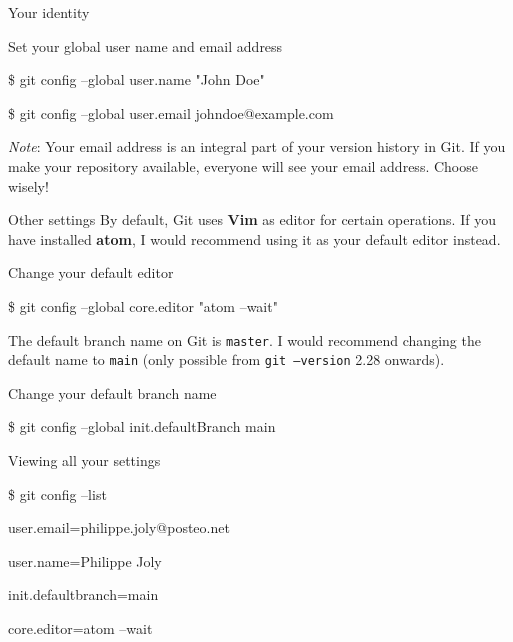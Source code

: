 \documentclass[handout]{beamer}
\begin{document}
\begin{frame}{Your identity}
  \begin{exampleblock}{Set your global user name and email address}
    \begin{semiverbatim}
      \item \$ git config --global user.name "John Doe"
      \item \$ git config --global user.email johndoe@example.com
    \end{semiverbatim}
  \end{exampleblock}
  \textit{Note}: Your email address is an integral part of your version history in Git. If you make your repository available, everyone will see your email address. Choose wisely!
\end{frame}

\begin{frame}{Other settings}
  By default, Git uses \textbf{Vim} as editor for certain operations. If you have installed \textbf{atom}, I would recommend using it as your default editor instead.  
  \begin{exampleblock}{Change your default editor}
    \begin{semiverbatim}
      \item \$ git config --global core.editor "atom --wait"
    \end{semiverbatim}
  \end{exampleblock}
  The default branch name on Git is \texttt{master}. I would recommend changing the default name to \texttt{main} (only possible from \texttt{git --version} 2.28 onwards). 
  \begin{exampleblock}{Change your default branch name}
    \begin{semiverbatim}
      \item \$ git config --global init.defaultBranch main
    \end{semiverbatim}
  \end{exampleblock}
\end{frame}

\begin{frame}{Viewing all your settings}
  \begin{exampleblock}{}
    \begin{semiverbatim}
      \item \$ git config --list
    \end{semiverbatim}
  \end{exampleblock}
  \begin{exampleblock}{}
    \begin{semiverbatim}
      \item user.email=philippe.joly@posteo.net
      \item user.name=Philippe Joly
      \item init.defaultbranch=main
      \item core.editor=atom --wait
    \end{semiverbatim}
  \end{exampleblock}
\end{frame}
\end{document}
